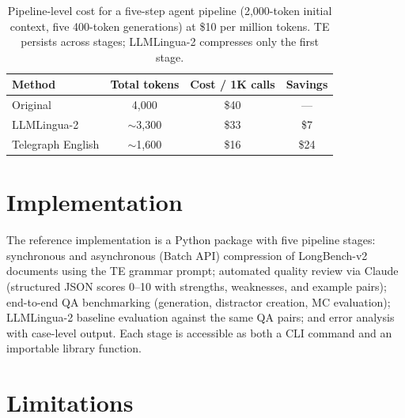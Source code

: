 \documentclass{article}
\begin{document}
\begin{table}[h]
  \caption{Pipeline-level cost for a five-step agent pipeline (2{,}000-token initial context, five 400-token generations) at \$10 per million tokens. TE persists across stages; LLMLingua-2 compresses only the first stage.}
  \label{tab:cost}
  \centering
  \small
  \begin{tabular}{lccc}
    \toprule
    Method & Total tokens & Cost / 1K calls & Savings \\
    \midrule
    Original          & 4{,}000 & \$40 & --- \\
    LLMLingua-2       & $\sim$3{,}300 & \$33 & \$7 \\
    Telegraph English & $\sim$1{,}600 & \$16 & \$24 \\
    \bottomrule
  \end{tabular}
\end{table}

\section{Implementation}

The reference implementation is a Python package with five pipeline stages: synchronous and asynchronous (Batch API) compression of LongBench-v2 documents using the TE grammar prompt; automated quality review via Claude (structured JSON scores 0--10 with strengths, weaknesses, and example pairs); end-to-end QA benchmarking (generation, distractor creation, MC evaluation); LLMLingua-2 baseline evaluation against the same QA pairs; and error analysis with case-level output. Each stage is accessible as both a CLI command and an importable library function.

\section{Limitations}
\end{document}
